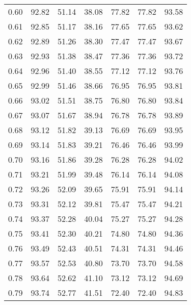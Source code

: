 \begin{tabular}{|c|c|c|c|c|c|c|}
      0.60 &     92.82 &     51.14 &      38.08 &   77.82 &      77.82 &         93.58 \\
      0.61 &     92.85 &     51.17 &      38.16 &   77.65 &      77.65 &         93.62 \\
      0.62 &     92.89 &     51.26 &      38.30 &   77.47 &      77.47 &         93.67 \\
      0.63 &     92.93 &     51.38 &      38.47 &   77.36 &      77.36 &         93.72 \\
      0.64 &     92.96 &     51.40 &      38.55 &   77.12 &      77.12 &         93.76 \\
      0.65 &     92.99 &     51.46 &      38.66 &   76.95 &      76.95 &         93.81 \\
      0.66 &     93.02 &     51.51 &      38.75 &   76.80 &      76.80 &         93.84 \\
      0.67 &     93.07 &     51.67 &      38.94 &   76.78 &      76.78 &         93.89 \\
      0.68 &     93.12 &     51.82 &      39.13 &   76.69 &      76.69 &         93.95 \\
      0.69 &     93.14 &     51.83 &      39.21 &   76.46 &      76.46 &         93.99 \\
      0.70 &     93.16 &     51.86 &      39.28 &   76.28 &      76.28 &         94.02 \\
      0.71 &     93.21 &     51.99 &      39.48 &   76.14 &      76.14 &         94.08 \\
      0.72 &     93.26 &     52.09 &      39.65 &   75.91 &      75.91 &         94.14 \\
      0.73 &     93.31 &     52.12 &      39.81 &   75.47 &      75.47 &         94.21 \\
      0.74 &     93.37 &     52.28 &      40.04 &   75.27 &      75.27 &         94.28 \\
      0.75 &     93.41 &     52.30 &      40.21 &   74.80 &      74.80 &         94.36 \\
      0.76 &     93.49 &     52.43 &      40.51 &   74.31 &      74.31 &         94.46 \\
      0.77 &     93.57 &     52.53 &      40.80 &   73.70 &      73.70 &         94.58 \\
      0.78 &     93.64 &     52.62 &      41.10 &   73.12 &      73.12 &         94.69 \\
      0.79 &     93.74 &     52.77 &      41.51 &   72.40 &      72.40 &         94.83 \\

\end{tabular}
